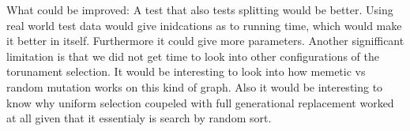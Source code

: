 What could be improved: A test that also tests splitting would be better. Using real world test data would give inidcations as to running time, which would make it better in itself. Furthermore it could give more parameters. Another signifficant limitation is that we did not get time to look into other configurations of the torunament selection. It would be interesting to look into how memetic vs random mutation works on this kind of graph. Also it would be interesting to know why uniform selection coupeled with full generational replacement worked at all given that it essentialy is search by random sort.

\cleardoublepage
